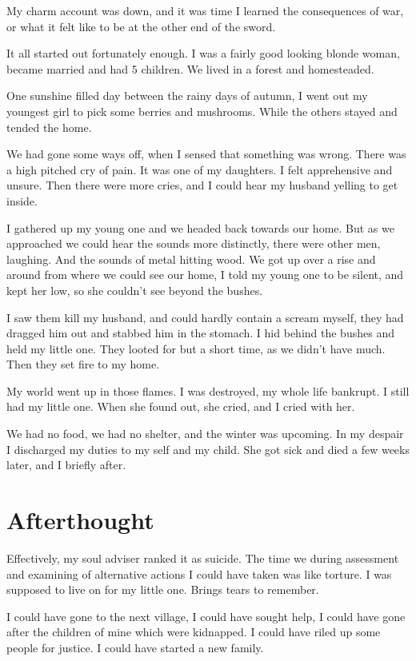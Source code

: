 My charm account was down, and it was time I learned the consequences of war, or
what it felt like to be at the other end of the sword. 

It all started out fortunately enough. I was a fairly good looking blonde woman,
became married and had 5 children. We lived in a forest and homesteaded. 

One sunshine filled day between the rainy days of autumn, I went out  my
youngest girl to pick some berries and mushrooms. While the others stayed and
tended the home. 

We had gone some ways off, when I sensed that something was wrong. There was a
high pitched cry of pain. It was one of my daughters. I felt apprehensive and
unsure. Then there were more cries, and I could hear my husband yelling to get
inside. 

I gathered up my young one and we headed back towards our home. But as we
approached we could hear the sounds more distinctly, there were other men,
laughing. And the sounds of metal hitting wood.
We got up over a rise and around from where we could see our home, 
I told my young one to be silent, and kept her low, so she couldn't see 
beyond the bushes. 

I saw them kill my husband, and could hardly contain a scream myself, they had
dragged him out and stabbed him in the stomach. I hid behind the bushes and held
my little one.  They looted for but a short time, as we didn't have much. Then
they set fire to my home. 

My world went up in those flames. I was destroyed, my whole life bankrupt. I
still had my little one. When she found out, she cried, and I cried with her.

We had no food, we had no shelter, and the winter was upcoming. In my despair I
discharged my duties to my self and my child. She got sick and died a few weeks
later, and I briefly after. 

\section{Afterthought}

Effectively, my soul adviser ranked it as suicide. The time we during assessment
and examining of alternative actions I could have taken was like torture. 
I was supposed to live on for my little one. Brings tears to remember.

I could have gone to the next village, I could have sought help, I could have
gone after the children of mine which were kidnapped. I could have riled up some
people for justice. I could have started a new family.

